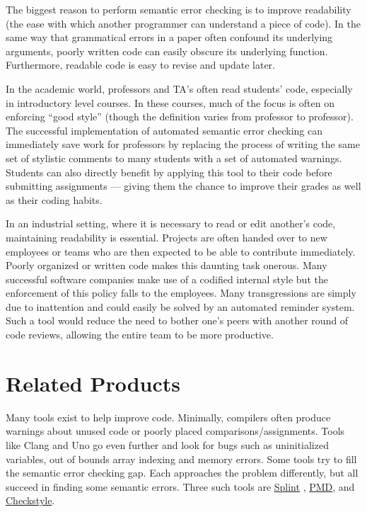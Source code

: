 \documentclass[12pt]{report}
\begin{document}
The biggest reason to perform semantic error checking is to improve readability (the 
ease with which another programmer can understand a piece of code). In the same way that 
grammatical errors in a paper often confound its underlying arguments, poorly written code can easily 
obscure its underlying function. Furthermore, readable code is easy to revise and update later. 

In the academic world, professors and TA's often read students' code, especially in introductory level
courses. In these courses, much of the focus is often on enforcing ``good style'' (though the definition 
varies from professor to professor).  The successful implementation of automated semantic error 
checking can immediately save work for professors by replacing the process of writing the same set of 
stylistic comments to many students with a set of automated warnings. Students can also directly 
benefit by applying this tool to their code before submitting assignments --- giving them the chance to 
improve their grades as well as their coding habits.

In an industrial setting, where it is necessary to read or edit another's code, maintaining readability is 
essential. Projects are often handed over to new employees or teams who are then expected to be 
able to contribute immediately. Poorly organized or written code makes this daunting task 
onerous. Many successful software companies make use of a codified internal style but the 
enforcement of this policy falls to the employees. Many transgressions are simply due to inattention 
and could easily be solved by an automated reminder system. Such a tool would reduce the need to 
bother one's peers with another round of code reviews, allowing the entire team to be more productive. 

\chapter{Related Products}

Many tools exist to help improve code. Minimally, compilers often produce warnings about unused code 
or poorly placed comparisons\slash assignments. Tools like Clang\cite{clang} and Uno\cite{Uno} go 
even further and look for bugs such as uninitialized variables, out of bounds array indexing and memory 
errors. Some tools try to fill the semantic error checking gap. Each approaches the problem differently, 
but all succeed in finding some semantic errors. Three such tools are 
\hyperref[sec:splint]{Splint}\cite{splint-manual} , \hyperref[sec:pmdAndCheckstyle]{PMD}\cite{pmd}, and 
\hyperref[sec:pmdAndCheckstyle]{Checkstyle}\cite{checkstyle}.
\end{document}

